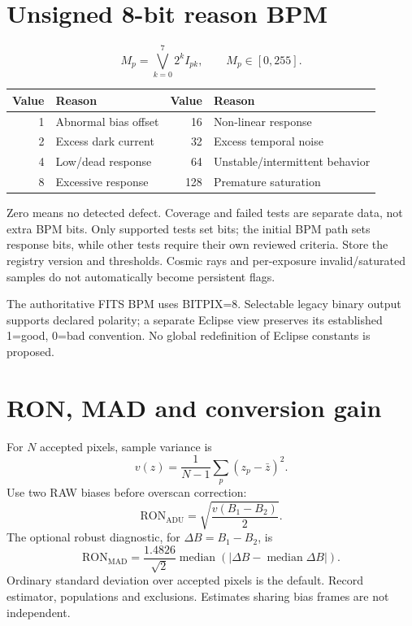 \documentclass[11pt,a4paper]{article}
\newcommand{\nextpage}{\clearpage}
\begin{document}
\section{Unsigned 8-bit reason BPM}
\begin{equation}\boxed{M_p=\bigvee_{k=0}^{7}2^k I_{pk}},\qquad M_p\in[0,255].\end{equation}
\begin{tabularx}{\linewidth}{@{}rXrX@{}}\toprule
Value & Reason & Value & Reason\\\midrule
1 & Abnormal bias offset & 16 & Non-linear response\\
2 & Excess dark current & 32 & Excess temporal noise\\
4 & Low/dead response & 64 & Unstable/intermittent behavior\\
8 & Excessive response & 128 & Premature saturation\\\bottomrule
\end{tabularx}

Zero means no detected defect. Coverage and failed tests are separate data, not extra BPM bits. Only supported tests set bits; the initial BPM path sets response bits, while other tests require their own reviewed criteria. Store the registry version and thresholds. Cosmic rays and per-exposure invalid/saturated samples do not automatically become persistent flags.

The authoritative FITS BPM uses BITPIX=8. Selectable legacy binary output supports declared polarity; a separate Eclipse view preserves its established 1=good, 0=bad convention. No global redefinition of Eclipse constants is proposed.

\nextpage
\section{RON, MAD and conversion gain}
For $N$ accepted pixels, sample variance is
\begin{equation}v(z)=\frac{1}{N-1}\sum_p(z_p-\bar z)^2.
\end{equation}
Use two RAW biases before overscan correction:
\begin{equation}\boxed{\mathrm{RON}_{\mathrm{ADU}}=\sqrt{\frac{v(B_1-B_2)}{2}}}.
\end{equation}
The optional robust diagnostic, for $\Delta B=B_1-B_2$, is
\begin{equation}\mathrm{RON}_{\mathrm{MAD}}=
\frac{1.4826}{\sqrt2}\operatorname{median}
\left(|\Delta B-\operatorname{median}\Delta B|\right).
\end{equation}
Ordinary standard deviation over accepted pixels is the default. Record estimator, populations and exclusions. Estimates sharing bias frames are not independent.
\end{document}
